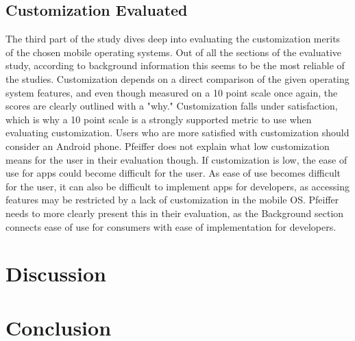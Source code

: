 \documentclass[11pt]{article}
\begin{document}
\subsection{Customization Evaluated}
The third part of the study dives deep into evaluating the customization merits of the chosen mobile operating systems. Out of all the sections of the evaluative study, according to background information this seems to be the most reliable of the studies. Customization depends on a direct comparison of the given operating system features, and even though measured on a 10 point scale once again, the scores are clearly outlined with a "why." Customization falls under satisfaction, which is why a 10 point scale is a strongly supported metric to use when evaluating customization. Users who are more satisfied with customization should consider an Android phone. Pfeiffer does not explain what low customization means for the user in their evaluation though. If customization is low, the ease of use for apps could become difficult for the user. As ease of use becomes difficult for the user, it can also be difficult to implement apps for developers, as accessing features may be restricted by a lack of customization in the mobile OS. Pfeiffer needs to more clearly present this in their evaluation, as the Background section connects ease of use for consumers with ease of implementation for developers.
\section{Discussion}
\section{Conclusion}



\end{document}
